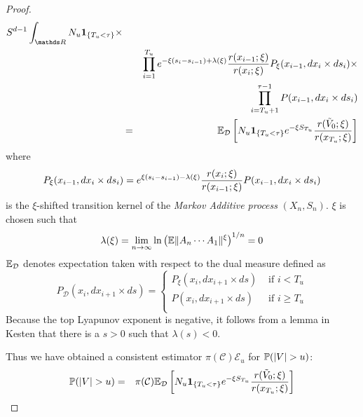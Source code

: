 \documentclass[aoas,preprint]{imsart}
\numberwithin{equation}{section}
\theoremstyle{plain}
\begin{document}
\begin{proof}
\begin{eqnarray*}
{      S^{d-1}} \int_{\mathds R} N_u \1{T_u < \tau} \times \\
    && \prod_{i=1}^{T_u} e^{-\xi(s_i - s_{i-1}) + \lambda(\xi)}
    {r(x_{i-1}; \xi) \over r(x_{i}; \xi)}P_\xi(x_{i-1}, dx_i \times ds_i) \times \\
    && \prod_{i=T_u+1}^{\tau-1} P(x_{i-1}, dx_i \times d s_i) \\
    &=& \E_{\mathcal D} \left[
      N_u \1{T_u < \tau} e^{-\xi S_{T_u}} {r(\tilde V_0; \xi)
        \over r(x_{T_u}; \xi)}
    \right]
  \end{eqnarray*}
  where
  \[
  P_\xi(x_{i-1}, dx_i \times ds_i) = e^{\xi(s_i - s_{i-1}) -
    \lambda(\xi)} {r(x_i; \xi) \over r(x_{i-1}; \xi)} P(x_{i-1}, dx_i
  \times ds_i)
  \]
  is the $\xi$-shifted transition kernel of the {\it Markov Additive
    process} $(X_n, S_n)$. $\xi$ is chosen such that 
  \[
  \lambda(\xi) = \lim_{n \to \infty} \ln \left(
    \E \|A_n \cdots A_1\|^\xi
  \right)^{1/n} = 0
  \]
  $\E_{\mathcal D}$ denotes expectation taken with respect to the dual
  measure defined as
  \[
  P_{\mathcal D} (x_i, dx_{i+1} \times ds) = \left\{
    \begin{array}{ll}
      P_\xi (x_i, dx_{i+1} \times ds) & \text{ if } i < T_u \\
      P(x_i, dx_{i+1} \times ds) & \text{ if } i \geq T_u \\
    \end{array}
  \right.
  \]
  Because the top Lyapunov exponent is negative, it follows from a lemma
  in Kesten \cite{Kesten1973} that there is a $s > 0$ such that
  $\lambda(s) < 0$.

  Thus we have obtained a consistent estimator
  $\pi(\mathcal C)\mathcal E_u$ for $\P(|V| > u)$:
  \begin{eqnarray*}
    \P(|V| > u) &=& \pi(\mathcal C) \E_{\mathcal D} \left[
      N_u \1{T_u < \tau} e^{-\xi S_{T_u}} {r(\tilde V_0; \xi)
        \over r(x_{T_u}; \xi)}
    \right]
  \end{eqnarray*}
\end{proof}
\end{document}
